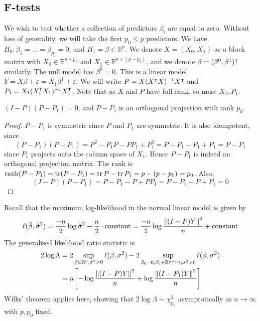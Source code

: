 \subsection{F-tests}
We wish to test whether a collection of predictors \( \beta_i \) are equal to zero.
Without loss of generality, we will take the first \( p_0 \leq p \) predictors.
We have \( H_0 \colon \beta_1 = \dots = \beta_{p_0} = 0 \), and \( H_1 = \beta \in \mathbb R^p \).
We denote \( X = (X_0, X_1) \) as a block matrix with \( X_0 \in \mathbb R^{n \times p_0} \) and \( X_1 \in \mathbb R^{n \times (p-p_0)} \), and we denote \( \beta = (\beta^0, \beta^1)^\intercal \) similarly.
The null model has \( \beta^0 = 0 \).
This is a linear model \( Y = X\beta + \varepsilon = X_1 \beta^1 + \varepsilon \).
We will write \( P = X(X^\intercal X)^{-1} X^\intercal \) and \( P_1 = X_1 (X_1^\intercal X_1)^{-1} X_1^\intercal \).
Note that as \( X \) and \( P \) have full rank, so must \( X_1, P_1 \).
\begin{lemma}
	\( (I-P)(P - P_1) = 0 \), and \( P - P_1 \) is an orthogonal projection with rank \( p_0 \).
\end{lemma}
\begin{proof}
	\( P - P_1 \) is symmetric since \( P \) and \( P_1 \) are symmetric.
	It is also idempotent, since
	\[
		(P-P_1)(P-P_1) = P^2 - P_1 P - P P_1 + P_1^2 = P - P_1 - P_1 + P_1 = P - P_1
	\]
	since \( P_1 \) projects onto the column space of \( X_1 \).
	Hence \( P - P_1 \) is indeed an orthogonal projection matrix.
	The rank is \( \rank(P - P_1) = \tr(P - P_1) = \tr P - \tr P_1 = p - (p - p_0) = p_0 \).
	Also,
	\[
		(I-P)(P-P_1) = P-P_1 - P + PP_1 = P-P_1 - P + P_1 = 0
	\]
\end{proof}
Recall that the maximum log-likelihood in the normal linear model is given by
\[
	\ell(\hat \beta, \hat \sigma^2) = \frac{-n}{2} \log \hat\sigma^2 - \frac{n}{2} \cdot \text{constant} = \frac{-n}{2} \log \frac{\norm{(I-P)Y}^2}{n} + \text{constant}
\]
The generalised likelihood ratio statistic is
\begin{align*}
	2 \log \Lambda & = 2 \sup_{\beta \in \mathbb R^p,\sigma^2>0} \ell(\beta, \sigma^2) - 2 \sup_{\beta_0 = 0, \beta_1 \in \mathbb R^{p-p_0},\sigma^2>0} \ell(\beta, \sigma^2) \\
	               & = n \qty[ -\log \frac{\norm{(I-P)Y}^2}{n} + \log \frac{\norm{(I-P_1)Y}^2}{n} ]
\end{align*}
Wilks' theorem applies here, showing that \( 2 \log \Lambda \sim \chi^2_{p_0} \) asymptotically as \( n \to \infty \) with \( p, p_0 \) fixed.
